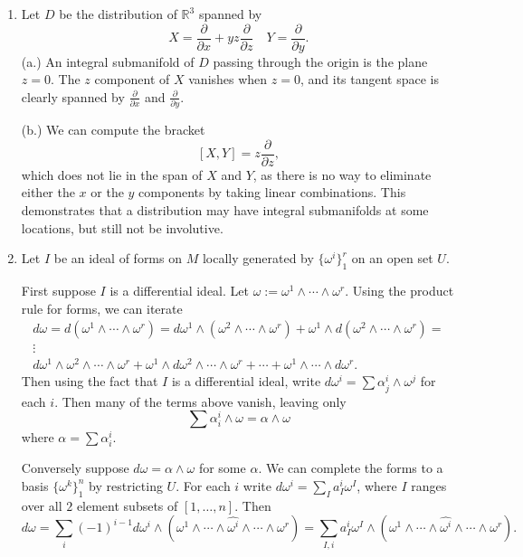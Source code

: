 \documentclass[11pt, reqno]{article}
\theoremstyle{plain}
\theoremstyle{definition}
\theoremstyle{remark}
\newcommand{\RR}{\mathbb{R}}
\begin{document}
\begin{enumerate}
    \item[2.] Let $D$ be the distribution of $\RR^3$ spanned by 
    \[
        X = \frac{\partial}{\partial x} + yz \frac{\partial}{\partial z} \quad Y = \frac{\partial}{\partial y}.
    \]
    (a.) An integral submanifold of $D$ passing through the origin is the plane $z = 0$. The 
    $z$ component of $X$ vanishes when $z = 0$, and its tangent space is clearly spanned by
    $\frac{\partial}{\partial x}$ and $\frac{\partial}{\partial y}$. 

    (b.) We can compute the bracket
    \[
        [X, Y] = z\frac{\partial}{\partial z},
    \]
    which does not lie in the span of $X$ and $Y$, as there is no way to eliminate either the $x$ or 
    the $y$ components by taking linear combinations. This demonstrates that a distribution may have integral
    submanifolds at some locations, but still not be involutive.

    \item[3.] Let $I$ be an ideal of forms on $M$ locally generated by $\{\omega^i\}_1^r$ on an open 
    set $U$.

    First suppose $I$ is a differential ideal. Let $\omega := \omega^1 \wedge \cdots \wedge \omega^r$. 
    Using the product rule for forms, we can iterate
    \begin{align*}
        d\omega = d(\omega^1 \wedge \cdots \wedge \omega^r) = 
        d\omega^1 \wedge (\omega^2 \wedge \cdots \wedge \omega^r) + 
        \omega^1 \wedge d(\omega^2 \wedge \cdots \wedge \omega^r) = \\
        \vdots\\
        d\omega^1 \wedge \omega^2 \wedge \cdots \wedge \omega^r + 
        \omega^1 \wedge d\omega^2 \wedge \cdots \wedge \omega^r + 
        \cdots + \omega^1 \wedge \cdots \wedge d\omega^r.
    \end{align*}
    Then using the fact that $I$ is a differential ideal, write $d\omega^i = \sum \alpha_j^i \wedge \omega^j$
    for each $i$. Then many of the terms above vanish, leaving only
    \[
        \sum \alpha_i^i \wedge \omega = \alpha \wedge \omega
    \]
    where $\alpha = \sum \alpha_i^i$.

    Conversely suppose $d\omega = \alpha \wedge \omega$ for some $\alpha$. We can complete the forms to a basis $\{\omega^k\}_1^n$ by restricting $U$. For each $i$ write
    $d\omega^i = \sum_{I} a_I^i \omega^I$, where $I$ ranges over all $2$ element subsets of $[1,\dots, n]$. Then
    \begin{equation}\label{1}
        d\omega = \sum_i (-1)^{i-1} d\omega^i \wedge (\omega^1 \wedge \cdots \wedge \widehat{\omega^i} \wedge \cdots \wedge \omega^r)
        = \sum_{I, i} a_I^i \omega^I \wedge (\omega^1 \wedge \cdots \wedge \widehat{\omega^i} \wedge \cdots \wedge \omega^r).
    \end{equation}
    

\end{enumerate}
\end{document}
